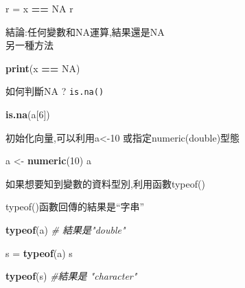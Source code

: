 \documentclass[]{book}
\newenvironment{Shaded}{\begin{snugshade}}{\end{snugshade}}
\newcommand{\CommentTok}[1]{\textcolor[rgb]{0.56,0.35,0.01}{\textit{#1}}}
\newcommand{\DecValTok}[1]{\textcolor[rgb]{0.00,0.00,0.81}{#1}}
\newcommand{\KeywordTok}[1]{\textcolor[rgb]{0.13,0.29,0.53}{\textbf{#1}}}
\newcommand{\NormalTok}[1]{#1}
\newcommand{\OperatorTok}[1]{\textcolor[rgb]{0.81,0.36,0.00}{\textbf{#1}}}
\newcommand{\OtherTok}[1]{\textcolor[rgb]{0.56,0.35,0.01}{#1}}
\newcommand{\StringTok}[1]{\textcolor[rgb]{0.31,0.60,0.02}{#1}}
\theoremstyle{definition}
\theoremstyle{definition}
\theoremstyle{definition}
\theoremstyle{remark}
\begin{document}
\begin{Shaded}
\begin{Highlighting}[]
\NormalTok{r =}\StringTok{ }\NormalTok{x }\OperatorTok{==}\StringTok{ }\OtherTok{NA}
\NormalTok{r}
\end{Highlighting}
\end{Shaded}

結論:任何變數和NA運算,結果還是NA\\
另一種方法

\begin{Shaded}
\begin{Highlighting}[]
\KeywordTok{print}\NormalTok{(x }\OperatorTok{==}\StringTok{ }\OtherTok{NA}\NormalTok{)}
\end{Highlighting}
\end{Shaded}

如何判斷NA ? \texttt{is.na()}

\begin{Shaded}
\begin{Highlighting}[]
    \KeywordTok{is.na}\NormalTok{(a[}\DecValTok{6}\NormalTok{])}
\end{Highlighting}
\end{Shaded}

初始化向量,可以利用a\textless{}-10 或指定numeric(double)型態

\begin{Shaded}
\begin{Highlighting}[]
\NormalTok{a <-}\StringTok{ }\KeywordTok{numeric}\NormalTok{(}\DecValTok{10}\NormalTok{) }
\NormalTok{a}
\end{Highlighting}
\end{Shaded}

如果想要知到變數的資料型別,利用函數typeof()

typeof()函數回傳的結果是``字串''

\begin{Shaded}
\begin{Highlighting}[]
\KeywordTok{typeof}\NormalTok{(a) }\CommentTok{# 結果是"double"}
\end{Highlighting}
\end{Shaded}

\begin{Shaded}
\begin{Highlighting}[]
\NormalTok{s =}\StringTok{ }\KeywordTok{typeof}\NormalTok{(a)}
\NormalTok{s}
\end{Highlighting}
\end{Shaded}

\begin{Shaded}
\begin{Highlighting}[]
\KeywordTok{typeof}\NormalTok{(s) }\CommentTok{#結果是 "character"}
\end{Highlighting}
\end{Shaded}
\end{document}
